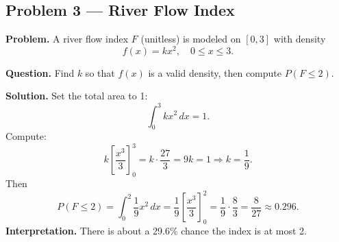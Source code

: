 \begin{ExamProblems}
		
		\hypertarget{c1-ex3}{}
		\item
		\subsection*{Problem 3 — River Flow Index}
		
		\textbf{Problem.}
		A river flow index \(F\) (unitless) is modeled on \([0,3]\) with density
		\[
		f(x)=k x^2,\quad 0\le x\le 3.
		\]
		
		\textbf{Question.} Find \(k\) so that \(f(x)\) is a valid density, then compute \(P(F\le 2)\).
		
		\textbf{Solution.}
		Set the total area to 1:
		\[
		\int_0^3 kx^2\,dx=1.
		\]
		Compute:
		\[
		k\left[\frac{x^3}{3}\right]_0^3=k\cdot\frac{27}{3}=9k=1\Rightarrow k=\frac{1}{9}.
		\]
		Then
		\[
		P(F\le 2)=\int_0^2 \frac{1}{9}x^2\,dx=\frac{1}{9}\left[\frac{x^3}{3}\right]_0^2
		=\frac{1}{9}\cdot\frac{8}{3}=\frac{8}{27}\approx 0.296.
		\]
		\textbf{Interpretation.} There is about a 29.6\% chance the index is at most 2.
		
	\end{ExamProblems}
	
	
